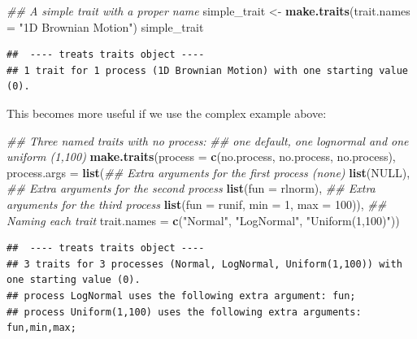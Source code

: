 \documentclass[
]{book}
\newenvironment{Shaded}{\begin{snugshade}}{\end{snugshade}}
\newcommand{\CommentTok}[1]{\textcolor[rgb]{0.56,0.35,0.01}{\textit{#1}}}
\newcommand{\DataTypeTok}[1]{\textcolor[rgb]{0.13,0.29,0.53}{#1}}
\newcommand{\DecValTok}[1]{\textcolor[rgb]{0.00,0.00,0.81}{#1}}
\newcommand{\KeywordTok}[1]{\textcolor[rgb]{0.13,0.29,0.53}{\textbf{#1}}}
\newcommand{\NormalTok}[1]{#1}
\newcommand{\OtherTok}[1]{\textcolor[rgb]{0.56,0.35,0.01}{#1}}
\newcommand{\StringTok}[1]{\textcolor[rgb]{0.31,0.60,0.02}{#1}}
\begin{document}
\begin{Shaded}
\begin{Highlighting}[]
\CommentTok{\#\# A simple trait with a proper name}
\NormalTok{simple\_trait \textless{}{-}}\StringTok{ }\KeywordTok{make.traits}\NormalTok{(}\DataTypeTok{trait.names =} \StringTok{"1D Brownian Motion"}\NormalTok{)}
\NormalTok{simple\_trait}
\end{Highlighting}
\end{Shaded}

\begin{verbatim}
##  ---- treats traits object ---- 
## 1 trait for 1 process (1D Brownian Motion) with one starting value (0).
\end{verbatim}

This becomes more useful if we use the complex example above:

\begin{Shaded}
\begin{Highlighting}[]
\CommentTok{\#\# Three named traits with no process:}
\CommentTok{\#\# one default, one lognormal and one uniform (1,100)}
\KeywordTok{make.traits}\NormalTok{(}\DataTypeTok{process      =} \KeywordTok{c}\NormalTok{(no.process, no.process, no.process),}
            \DataTypeTok{process.args =} \KeywordTok{list}\NormalTok{(}\CommentTok{\#\# Extra arguments for the first process (none)}
                                \KeywordTok{list}\NormalTok{(}\OtherTok{NULL}\NormalTok{),}
                                \CommentTok{\#\# Extra arguments for the second process}
                                \KeywordTok{list}\NormalTok{(}\DataTypeTok{fun =}\NormalTok{ rlnorm),}
                                \CommentTok{\#\# Extra arguments for the third process}
                                \KeywordTok{list}\NormalTok{(}\DataTypeTok{fun =}\NormalTok{ runif, }\DataTypeTok{min =} \DecValTok{1}\NormalTok{, }\DataTypeTok{max =} \DecValTok{100}\NormalTok{)),}
            \CommentTok{\#\# Naming each trait}
            \DataTypeTok{trait.names  =} \KeywordTok{c}\NormalTok{(}\StringTok{"Normal"}\NormalTok{, }\StringTok{"LogNormal"}\NormalTok{, }\StringTok{"Uniform(1,100)"}\NormalTok{))}
\end{Highlighting}
\end{Shaded}

\begin{verbatim}
##  ---- treats traits object ---- 
## 3 traits for 3 processes (Normal, LogNormal, Uniform(1,100)) with one starting value (0).
## process LogNormal uses the following extra argument: fun;
## process Uniform(1,100) uses the following extra arguments: fun,min,max;
\end{verbatim}
\end{document}
